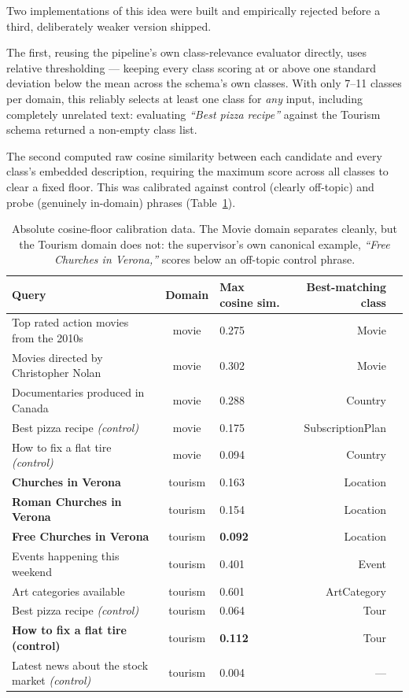 \documentclass[11pt,a4paper,oneside]{book}
\begin{document}
Two implementations of this idea were built and empirically rejected before a third, deliberately
weaker version shipped.

The first, reusing the pipeline's own class-relevance evaluator directly, uses relative
thresholding --- keeping every class scoring at or above one standard deviation below the mean
across the schema's own classes. With only 7--11 classes per domain, this reliably selects at least
one class for \emph{any} input, including completely unrelated text: evaluating \emph{``Best pizza
recipe''} against the Tourism schema returned a non-empty class list.

The second computed raw cosine similarity between each candidate and every class's embedded
description, requiring the maximum score across all classes to clear a fixed floor. This was
calibrated against control (clearly off-topic) and probe (genuinely in-domain) phrases
(Table~\ref{tab:rec-calibration}).

\begin{table}[H]
\centering
\begin{tabular}{lclr l}
\toprule
\textbf{Query} & \textbf{Domain} & \textbf{Max cosine sim.} & \textbf{Best-matching class} \\
\midrule
Top rated action movies from the 2010s        & movie    & 0.275 & Movie \\
Movies directed by Christopher Nolan          & movie    & 0.302 & Movie \\
Documentaries produced in Canada              & movie    & 0.288 & Country \\
Best pizza recipe \emph{(control)}            & movie    & 0.175 & SubscriptionPlan \\
How to fix a flat tire \emph{(control)}       & movie    & 0.094 & Country \\
\textbf{Churches in Verona}                   & tourism  & 0.163 & Location \\
\textbf{Roman Churches in Verona}             & tourism  & 0.154 & Location \\
\textbf{Free Churches in Verona}              & tourism  & \textbf{0.092} & Location \\
Events happening this weekend                 & tourism  & 0.401 & Event \\
Art categories available                      & tourism  & 0.601 & ArtCategory \\
Best pizza recipe \emph{(control)}            & tourism  & 0.064 & Tour \\
\textbf{How to fix a flat tire (control)}     & tourism  & \textbf{0.112} & Tour \\
Latest news about the stock market \emph{(control)} & tourism & 0.004 & --- \\
\bottomrule
\end{tabular}
\caption{Absolute cosine-floor calibration data. The Movie domain separates cleanly, but the
Tourism domain does not: the supervisor's own canonical example, \emph{``Free Churches in
Verona,''} scores below an off-topic control phrase.}
\label{tab:rec-calibration}
\end{table}
\end{document}
